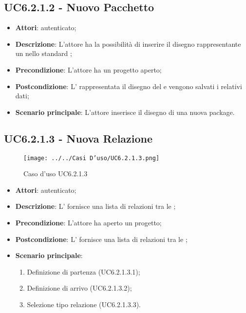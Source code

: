 \subsection{UC6.2.1.2 - Nuovo Pacchetto}
\label{ssec:UC6.2.1.2}
\begin{itemize}
\item \textbf{Attori}:  autenticato;
\item \textbf{Descrizione}: L'attore ha la possibilità di inserire il disegno rappresentante un  nello standard ;
\item \textbf{Precondizione}: L'attore ha un progetto aperto;
\item \textbf{Postcondizione}: L' rappresentata il disegno del  e vengono salvati i relativi dati;
\item \textbf{Scenario principale}: L'attore inserisce il disegno di una nuova package.
\end{itemize}
\newpage
\subsection{UC6.2.1.3 - Nuova Relazione}
\label{ssec:UC6.2.1.3}
\begin{figure}[h!]
\centering
\texttt{[image: ../../Casi D'uso/UC6.2.1.3.png]}
\caption{Caso d'uso UC6.2.1.3}
 \end{figure}
\begin{itemize}
\item \textbf{Attori}:  autenticato;
\item \textbf{Descrizione}: L' fornisce una lista di relazioni tra le ;
\item \textbf{Precondizione}: L'attore ha aperto un progetto;
\item \textbf{Postcondizione}: L' fornisce una lista di relazioni tra le ;
\item \textbf{Scenario principale}: \begin{enumerate}\item Definizione  di partenza (UC6.2.1.3.1);\item Definizione  di arrivo (UC6.2.1.3.2);\item Selezione tipo relazione (UC6.2.1.3.3).
 \end{enumerate}
\end{itemize}
